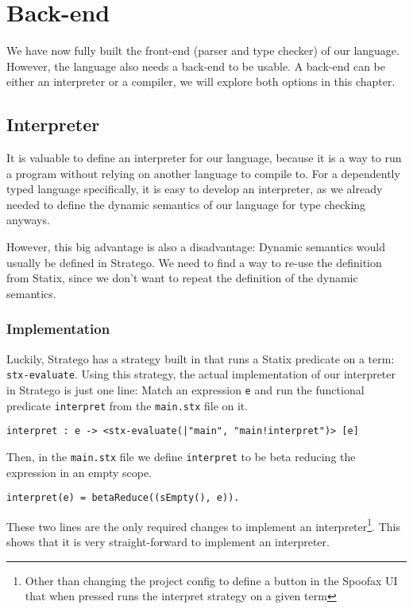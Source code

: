 \chapter{Back-end}
\label{ch:backend}

We have now fully built the front-end (parser and type checker) of our language. However, the language also needs a back-end to be usable. A back-end can be either an interpreter or a compiler, we will explore both options in this chapter.

\section{Interpreter}
It is valuable to define an interpreter for our language, because it is a way to run a program without relying on another language to compile to. For a dependently typed language specifically, it is easy to develop an interpreter, as we already needed to define the dynamic semantics of our language for type checking anyways. 

However, this big advantage is also a disadvantage: Dynamic semantics would usually be defined in Stratego. We need to find a way to re-use the definition from Statix, since we don't want to repeat the definition of the dynamic semantics.

\subsection{Implementation}

Luckily, Stratego has a strategy built in that runs a Statix predicate on a term: \verb|stx-evaluate|. Using this strategy, the actual implementation of our interpreter in Stratego is just one line: Match an expression \verb|e| and run the functional predicate \verb|interpret| from the \verb|main.stx| file on it.

\begin{lstlisting}
interpret : e -> <stx-evaluate(|"main", "main!interpret")> [e]
\end{lstlisting}

Then, in the \verb|main.stx| file we define \verb|interpret| to be beta reducing the expression in an empty scope. 

\begin{lstlisting}
interpret(e) = betaReduce((sEmpty(), e)).
\end{lstlisting}

These two lines are the only required changes to implement an interpreter\footnote{Other than changing the project config to define a button in the Spoofax UI that when pressed runs the interpret strategy on a given term}. This shows that it is very straight-forward to implement an interpreter. 

